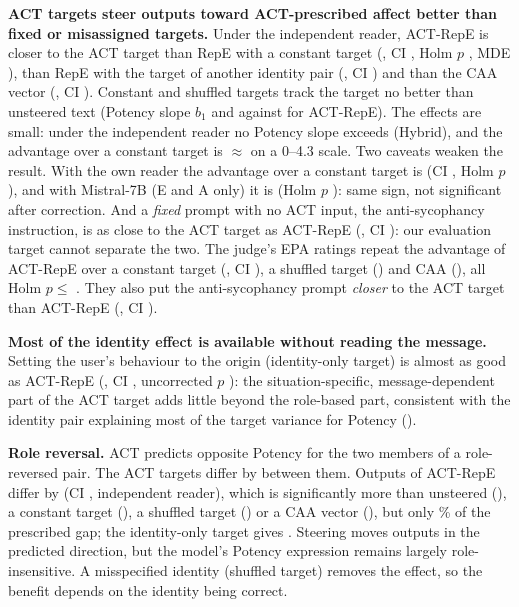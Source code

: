 \documentclass[letterpaper]{article} %
\begin{document}
\textbf{ACT targets steer outputs toward ACT-prescribed affect better than fixed or misassigned targets.} Under the independent reader, ACT-RepE is closer to the ACT target than RepE with a constant target (\AblRepeconstDelta, CI \AblRepeconstCi, Holm $p$ \AblRepeconstP, MDE \AblRepeconstMde), than RepE with the target of another identity pair (\AblRepeshuffledDelta, CI \AblRepeshuffledCi) and than the CAA vector (\AblCaaDelta, CI \AblCaaCi). Constant and shuffled targets track the target no better than unsteered text (Potency slope $b_1$ \TrackCrossRepeconstP{} and \TrackCrossRepeshuffledP{} against \TrackCrossRepeonlyP{} for ACT-RepE). The effects are small: under the independent reader no Potency slope exceeds \TrackCrossHybridP{} (Hybrid), and the advantage over a constant target is $\approx$\AblRepeconstDelta{} on a 0--4.3 scale. Two caveats weaken the result. With the own reader the advantage over a constant target is \AblMOwnRepeconstDelta{} (CI \AblMOwnRepeconstCi, Holm $p$ \AblMOwnRepeconstP), and with Mistral-7B (E and A only) it is \AblMMSevenbRepeconstDelta{} (Holm $p$ \AblMMSevenbRepeconstP): same sign, not significant after correction. And a \emph{fixed} prompt with no ACT input, the anti-sycophancy instruction, is as close to the ACT target as ACT-RepE (\AblAntisycpromptDelta, CI \AblAntisycpromptCi): our evaluation target cannot separate the two. The judge's EPA ratings repeat the advantage of ACT-RepE over a constant target (\JdEpaLlamaRepeconstVsRepE, CI \JdEpaLlamaRepeconstVsRepECi), a shuffled target (\JdEpaLlamaRepeshuffledVsRepE) and CAA (\JdEpaLlamaCaaVsRepE), all Holm $p \le$ \JdEpaLlamaCaaVsRepEP. They also put the anti-sycophancy prompt \emph{closer} to the ACT target than ACT-RepE (\JdEpaLlamaAntisycpromptVsRepE, CI \JdEpaLlamaAntisycpromptVsRepECi).

\textbf{Most of the identity effect is available without reading the message.} Setting the user's behaviour to the origin (identity-only target) is almost as good as ACT-RepE (\AblRepeidonlyDelta, CI \AblRepeidonlyCi, uncorrected $p$ \AblRepeidonlyP): the situation-specific, message-dependent part of the ACT target adds little beyond the role-based part, consistent with the identity pair explaining most of the target variance for Potency (\DesignRtwoPairP).

\textbf{Role reversal.} ACT predicts opposite Potency for the two members of a role-reversed pair. The ACT targets differ by \RoleRepeonlyTarget{} between them. Outputs of ACT-RepE differ by \RoleRepeonlyObs{} (CI \RoleRepeonlyCi, independent reader), which is significantly more than unsteered (\RoleUnsteeredObs), a constant target (\RoleRepeconstObs), a shuffled target (\RoleMCrossRepeshuffled) or a CAA vector (\RoleCaaObs), but only \RoleMCrossRepeonlyFrac\% of the prescribed gap; the identity-only target gives \RoleMCrossRepeidonly. Steering moves outputs in the predicted direction, but the model's Potency expression remains largely role-insensitive. A misspecified identity (shuffled target) removes the effect, so the benefit depends on the identity being correct.
\end{document}
